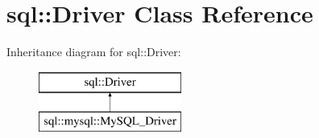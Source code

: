 \hypertarget{classsql_1_1_driver}{}\section{sql\+:\+:Driver Class Reference}
\label{classsql_1_1_driver}
Inheritance diagram for sql\+:\+:Driver\+:\begin{figure}[H]
\begin{center}
\leavevmode
\includegraphics[height=2.000000cm]{classsql_1_1_driver}
\end{center}
\end{figure}
